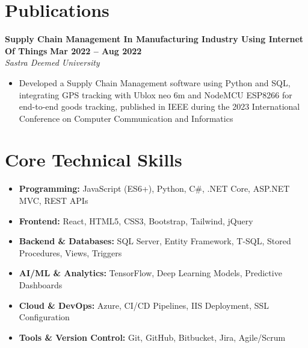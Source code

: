 \documentclass[a4paper,10pt]{article}
\begin{document}
\section{Publications}

\textbf{Supply Chain Management In Manufacturing Industry Using Internet Of Things} \hfill \textbf{Mar 2022 – Aug 2022} \\
\textit{Sastra Deemed University} 
\begin{itemize}[nosep,after=\strut, leftmargin=1em, itemsep=3pt,label=$\bullet$]
\item Developed a Supply Chain Management software using Python and SQL, integrating GPS tracking with Ublox neo 6m and NodeMCU ESP8266 for end-to-end goods tracking, published in IEEE during the 2023 International Conference on Computer Communication and Informatics
\end{itemize}

\section{Core Technical Skills}
\begin{itemize}[nosep,after=\strut, leftmargin=1em, itemsep=3pt,label=$\bullet$]
\item \textbf{Programming:} JavaScript (ES6+), Python, C\#, .NET Core, ASP.NET MVC, REST APIs
\item \textbf{Frontend:} React, HTML5, CSS3, Bootstrap, Tailwind, jQuery
\item \textbf{Backend \& Databases:} SQL Server, Entity Framework, T-SQL, Stored Procedures, Views, Triggers
\item \textbf{AI/ML \& Analytics:} TensorFlow, Deep Learning Models, Predictive Dashboards
\item \textbf{Cloud \& DevOps:} Azure, CI/CD Pipelines, IIS Deployment, SSL Configuration
\item \textbf{Tools \& Version Control:} Git, GitHub, Bitbucket, Jira, Agile/Scrum
\end{itemize}

\vfill
{}
\end{document}
